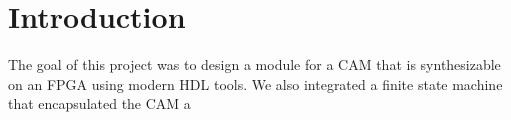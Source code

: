 \section{Introduction}
The goal of this project was to design a module for a CAM that is synthesizable on an FPGA using modern HDL tools. 
We also integrated a finite state machine that encapsulated the CAM a